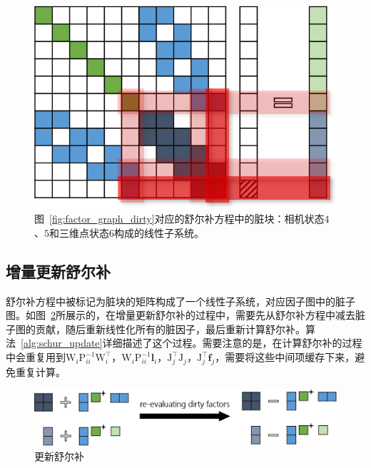 

\begin{figure}[htb!]
    \centering
    \includegraphics[scale=1]{Pictures/normal_eq_dirty.png}
    \caption{图~\ref{fig:factor_graph_dirty}对应的舒尔补方程中的脏块：相机状态$4$、$5$和三维点状态$6$构成的线性子系统。}
    \label{fig:normal_eq_dirty}
\end{figure}

\subsection{增量更新舒尔补}

舒尔补方程中被标记为脏块的矩阵构成了一个线性子系统，对应因子图中的脏子图。如图~\ref{fig:schur_update}所展示的，在增量更新舒尔补的过程中，需要先从舒尔补方程中减去脏子图的贡献，随后重新线性化所有的脏因子，最后重新计算舒尔补。算法~\ref{alg:schur_update}详细描述了这个过程。需要注意的是，在计算舒尔补的过程中会重复用到$\mathrm{W}_i\mathrm{P}_{ii}^{-1}\mathrm{W}_i^\top$，$\mathrm{W}_i\mathrm{P}_{ii}^{-1}\bm{l}_i$，$\mathrm{J}_j^\top\mathrm{J}_j$，$\mathrm{J}_j^\top\bm{f}_j$，需要将这些中间项缓存下来，避免重复计算。



\begin{figure}[htb!]
    \centering
    \includegraphics[width=\textwidth]{Pictures/schur_update.png}
    \caption{更新舒尔补}
    \label{fig:schur_update}
\end{figure}

